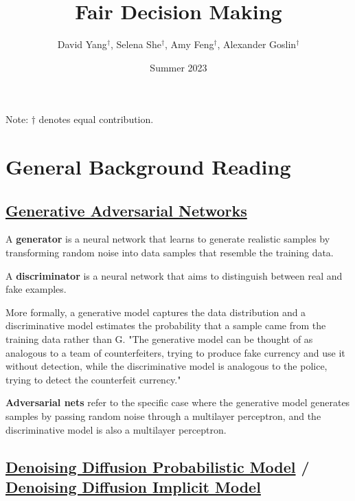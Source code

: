 \documentclass[12pt]{amsart}
\title{Fair Decision Making}
\author{David Yang$^{\dagger}$, Selena She$^{\dagger}$, Amy Feng$^{\dagger}$, Alexander Goslin$^{\dagger}$}
\date{Summer 2023}
\begin{document}
\maketitle

\begin{center}
    Note: $\dagger$ denotes equal contribution.
\end{center}

\section{General Background Reading}
\subsection{\href{https://arxiv.org/abs/1406.2661}{Generative Adversarial Networks}}

\begin{definition}[Generator]
A \textbf{generator} is a neural network that learns to generate realistic samples by transforming random noise into data samples that resemble the training data.
\end{definition}

\begin{definition}[Discriminator]
A \textbf{discriminator} is a neural network that aims to distinguish between real and fake examples.
\end{definition}

More formally, a generative model captures the data distribution and a discriminative model estimates the probability that a sample came from the training data rather than G. "The generative model can be thought of as analogous to a team of counterfeiters, trying to produce fake currency and use it without detection, while the discriminative model is analogous to the police, trying to detect the counterfeit currency."

\begin{definition}
\textbf{Adversarial nets} refer to the specific case where the generative model generates samples by passing random noise through a multilayer perceptron, and the discriminative model is also a multilayer perceptron. 
\end{definition}

\vspace{0.5cm}

\subsection{\href{https://arxiv.org/abs/2006.11239}{Denoising Diffusion Probabilistic Model} / \href{https://arxiv.org/abs/2010.02502}{Denoising Diffusion Implicit Model}}
\end{document}

